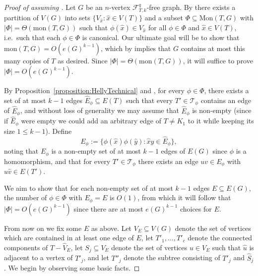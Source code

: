 \documentclass[10pt,a4paper]{amsart}
\newcommand{\pow}{q} %
\newcommand{\sub}{\subseteq}
\renewcommand{\c}[1]{\mathcal{#1}}
\begin{document}
	\begin{proof}[Proof of  assuming ]
		Let $G$ be an $n$-vertex $\c{F}_{T,k}^\pow$-free graph. By  there exists a partition of $V(G)$ into sets $\{V_{\hat{x}}:\hat{x}\in V(T)\}$ and a subset $\Phi\subseteq \mathrm{Mon}(T,G)$ with $|\Phi|=\Theta(\mathrm{mon}(T,G))$ such that $\phi(\hat{x})\in V_{\hat{x}}$ for all $\phi\in \Phi$ and $\hat{x}\in V(T)$, i.e.\ such that each $\phi\in \Phi$ is canonical.  Our ultimate goal will be to show that $\mathrm{mon}(T,G)=O(e(G)^{k-1})$, which by  implies that $G$ contains at most this many copies of $T$ as desired. Since $|\Phi|=\Theta(\mathrm{mon}(T,G))$, it will suffice to prove $|\Phi|=O(e(G)^{k-1})$.  
		
		By Proposition~\ref{proposition:HellyTechnical} and , for every $\phi\in \Phi$, there exists a set of at most $k-1$ edges $\widehat{E}_\phi\sub E(T)$ such that every $T'\in \c{T}_\phi$ contains an edge of $\widehat{E}_\phi$, and without loss of generality we may assume that $\widehat{E}_\phi$ is non-empty (since if $\widehat{E}_\phi$ were empty we could add an arbitrary edge of $T\ne K_1$ to it while keeping its size $1\le k-1$).  Define 
		\[
		E_\phi:=\{\phi(\hat{x})\phi(\hat{y}):\hat{x}\hat{y}\in \widehat{E}_\phi\},
		\] 
		noting that $E_\phi$ is a non-empty set of at most $k-1$ edges of $E(G)$ since $\phi$ is a homomorphism, and that for every $T'\in \c{T}_\phi$ there exists an edge $uv\in E_\phi$ with $\hat{u}\hat{v}\in E(T')$. %
		
		We aim to show that for each non-empty set of at most $k-1$ edges $E\sub E(G)$, the number of $\phi\in \Phi$ with $E_{\phi}=E$ is $O(1)$, from which it will follow that $|\Phi|=O(e(G)^{k-1})$ since there are at most $e(G)^{k-1}$ choices for $E$.
		
		From now on we fix some $E$ as above.	Let $V_E\sub V(G)$ denote the set of vertices which are contained in at least one edge of $E$, let $T'_1,\ldots,T'_c$ denote the connected components of $T-\widehat{V}_E$, let $S_j\sub V_E$ denote the set of vertices $u\in V_E$ such that $\hat{u}$ is adjacent to a vertex of $T'_j$, and let $T''_j$ denote the subtree consisting of $T'_j$ and $\widehat{S}_j$.   We begin by observing some basic facts.
		

\end{proof}
\end{document}
